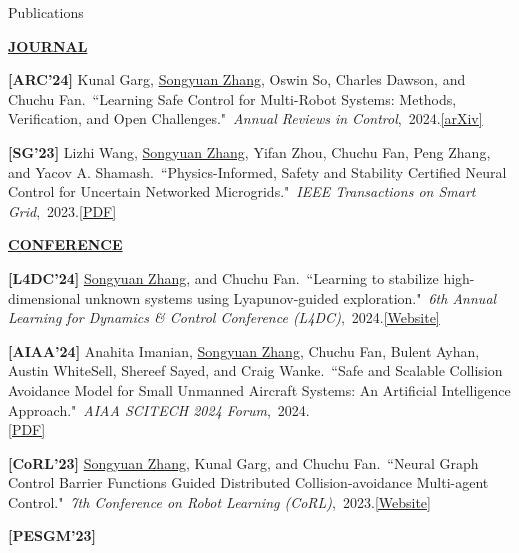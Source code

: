 \documentclass{resume} %
\newcommand{\paperItem}[4]{#1.~``#2."~\textit{#3},~#4.}%
\newcommand{\me}{\underline{Songyuan Zhang}}
\newcommand{\meshort}{\textbf{S. Zhang}}
\newcommand{\person}[2]{#1}
\begin{document}
	\begin{rSection}{Publications}
		\item[] \textbf{\underline{JOURNAL}}
		\vspace{5pt}
		{
			\item {\bf [ARC'24]}
			\paperItem{\person{Kunal Garg}{K. Garg}, \person{\me}{\meshort}, \person{Oswin So}{O. So}, \person{Charles Dawson}{C. Dawson}, and \person{Chuchu Fan}{C. Fan}}{Learning Safe Control for Multi-Robot Systems: Methods, Verification, and Open Challenges}{Annual Reviews in Control}{2024}{\href{https://arxiv.org/abs/2311.13714}{[arXiv]}}
			\item {\bf [SG'23]}
			\paperItem{\person{Lizhi Wang}{L. Wang}, \person{\me}{\meshort}, \person{Yifan Zhou}{Y. Zhou}, \person{Chuchu Fan}{C. Fan}, \person{Peng Zhang}{P. Zhang}, and \person{Yacov A. Shamash}{YA. Shamash}}{Physics-Informed, Safety and Stability Certified Neural Control for Uncertain Networked Microgrids}{IEEE Transactions on Smart Grid}{2023}{\href{https://ieeexplore.ieee.org/stamp/stamp.jsp?arnumber=10233047}{[PDF]}}
		}
		\vspace{5pt}
		\item[] \textbf{\underline{CONFERENCE}}
		\vspace{5pt}
		{	
			\item {\bf [L4DC'24]}
			\paperItem{\person{\me}{\meshort}, and \person{Chuchu Fan}{C. Fan}}{Learning to stabilize high-dimensional unknown systems using Lyapunov-guided exploration}{6th Annual Learning for Dynamics \& Control Conference (L4DC)}{2024}{\href{https://mit-realm.github.io/lyge-website/}{[Website]}}
			\item {\bf [AIAA'24]}
			\paperItem{\person{Anahita Imanian}{A. Imanian}, \person{\me}{\meshort}, \person{Chuchu Fan}{C. Fan}, \person{Bulent Ayhan}{B. Ayhan}, \person{Austin WhiteSell}{A. WhiteSell}, \person{Shereef Sayed}{S. Sayed}, and \person{Craig Wanke}{C. Wanke}}{Safe and Scalable Collision Avoidance Model for Small Unmanned Aircraft Systems: An Artificial Intelligence Approach}{AIAA SCITECH 2024 Forum}{2024}\\{\href{https://arc.aiaa.org/doi/abs/10.2514/6.2024-1081}{[PDF]}}
			\item {\bf [CoRL'23]}
			\paperItem{\person{\me}{\meshort}, \person{Kunal Garg}{K. Garg}, and \person{Chuchu Fan}{C. Fan}}{Neural Graph Control Barrier Functions Guided Distributed Collision-avoidance Multi-agent Control}{7th Conference on Robot Learning (CoRL)}{2023}{\href{https://mit-realm.github.io/gcbf-website/}{[Website]}}
			\item {\bf [PESGM'23]}
}
\end{rSection}
\end{document}
